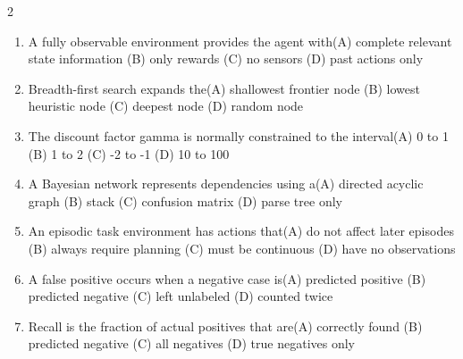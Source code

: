 \documentclass[a4paper]{article}
\begin{document}
\begin{multicols*}{2}
\begin{enumerate}[resume]
\item A fully observable environment provides the agent with\newline\hspace*{0.6em}(A) complete relevant state information \quad (B) only rewards \newline\hspace*{0.6em}(C) no sensors \quad (D) past actions only
\item Breadth-first search expands the\newline\hspace*{0.6em}(A) shallowest frontier node \quad (B) lowest heuristic node \newline\hspace*{0.6em}(C) deepest node \quad (D) random node
\item The discount factor gamma is normally constrained to the interval\newline\hspace*{0.6em}(A) 0 to 1 \quad (B) 1 to 2 \newline\hspace*{0.6em}(C) -2 to -1 \quad (D) 10 to 100
\item A Bayesian network represents dependencies using a\newline\hspace*{0.6em}(A) directed acyclic graph \quad (B) stack \newline\hspace*{0.6em}(C) confusion matrix \quad (D) parse tree only
\item An episodic task environment has actions that\newline\hspace*{0.6em}(A) do not affect later episodes \quad (B) always require planning \newline\hspace*{0.6em}(C) must be continuous \quad (D) have no observations
\item A false positive occurs when a negative case is\newline\hspace*{0.6em}(A) predicted positive \quad (B) predicted negative \newline\hspace*{0.6em}(C) left unlabeled \quad (D) counted twice
\item Recall is the fraction of actual positives that are\newline\hspace*{0.6em}(A) correctly found \quad (B) predicted negative \newline\hspace*{0.6em}(C) all negatives \quad (D) true negatives only

\end{enumerate}
\end{multicols*}
\end{document}
